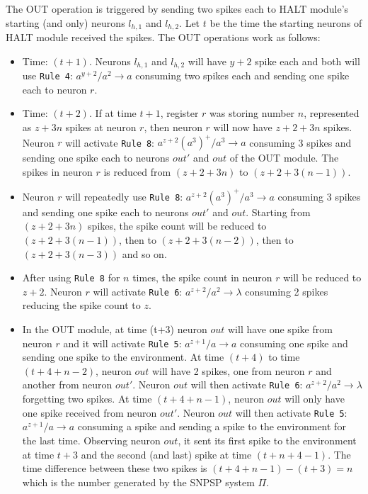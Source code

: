 \documentclass[smallextended]{svjour3}
\begin{document}
The OUT operation is triggered by sending two spikes each to HALT module's starting (and only) neurons $l_{h,1}$ and $l_{h,2}$. Let $t$ be the time
the starting neurons of HALT module received the spikes. The OUT operations work as follows:
\begin{itemize}
   \item Time: $(t+1)$. Neurons $l_{h,1}$ and $l_{h,2}$ will have $y+2$ spike each and both will use \texttt{Rule 4}: $a^{y+2}/a^2 \rightarrow a$
                        consuming two spikes each and sending one spike each to neuron $r$.
   \item Time: $(t+2)$. If at time $t+1$, register $r$ was storing number $n$, represented as $z+3n$ spikes at neuron $r$, then neuron $r$ will now
         have $z+2+3n$ spikes. Neuron $r$ will activate \texttt{Rule 8}: $a^{z+2}(a^3)^+/a^3 \rightarrow a$ consuming 3 spikes and sending one spike 
         each to neurons $out'$ and $out$ of the OUT module. The spikes in neuron $r$ is reduced from $(z+2+3n)$ to $(z+2+3(n-1))$. 
   \item Neuron $r$ will repeatedly use \texttt{Rule 8}: $a^{z+2}(a^3)^+/a^3 \rightarrow a$ consuming $3$ spikes and sending one spike each to 
         neurons $out'$ and $out$. Starting from $(z+2+3n)$ spikes, the spike count will be reduced to $(z+2+3(n-1))$, then to $(z+2+3(n-2))$, then 
         to $(z+2+3(n-3))$ and so on.
   \item After using \texttt{Rule 8} for $n$ times, the spike count in neuron $r$ will be reduced to $z+2$. Neuron $r$ will activate 
         \texttt{Rule 6}: $a^{z+2}/a^2 \rightarrow \lambda$ consuming 2 spikes reducing the spike count to $z$.
   \item In the OUT module, at time (t+3) neuron $out$ will have one spike from neuron $r$ and it will activate \texttt{Rule 5}: $a^{z+1}/a 
         \rightarrow a$ consuming one spike and sending one spike to the environment. At time $(t+4)$ to time $(t+4+n-2)$, neuron $out$ will have 2 
         spikes, one from neuron $r$ and another from neuron $out'$. Neuron $out$ will then activate \texttt{Rule 6}: $a^{z+2}/a^2 \rightarrow 
         \lambda$ forgetting two spikes. At time $(t+4+n-1)$, neuron $out$ will only have one spike received from neuron $out'$. Neuron $out$ will 
         then activate \texttt{Rule 5}: $a^{z+1}/a \rightarrow a$ consuming a spike and sending a spike to the environment for the last time.
         Observing neuron $out$, it sent its first spike to the environment at time $t+3$ and the second (and last) spike at time $(t+n+4-1)$. The
         time difference between these two spikes is $(t+4+n-1)-(t+3)=n$ which is the number generated by the SNPSP system $\Pi$.
\end{itemize}
\end{document}
